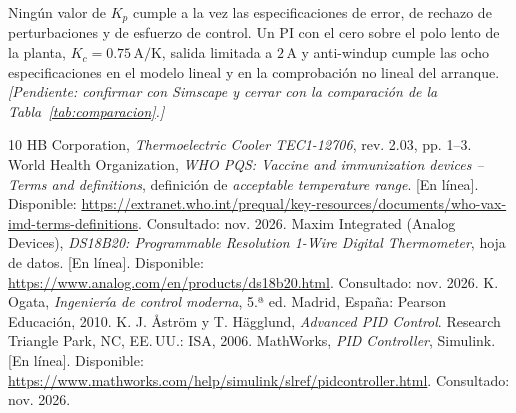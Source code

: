 \documentclass[journal,twocolumn]{IEEEtran}
\newcommand{\pendiente}[1]{\textit{[Pendiente: #1]}}
\begin{document}
Ningún valor de $K_p$ cumple a la vez las especificaciones de error, de rechazo de perturbaciones y de esfuerzo de control. Un PI con el cero sobre el polo lento de la planta, $K_c=0.75\,\mathrm{A/K}$, salida limitada a $2\,\mathrm A$ y anti-windup cumple las ocho especificaciones en el modelo lineal y en la comprobación no lineal del arranque. \pendiente{confirmar con Simscape y cerrar con la comparación de la Tabla~\ref{tab:comparacion}.}


\balance
\begin{thebibliography}{10}
 HB Corporation, \emph{Thermoelectric Cooler TEC1-12706}, rev. 2.03, pp. 1--3.
 World Health Organization, \emph{WHO PQS: Vaccine and immunization devices -- Terms and definitions}, definición de \emph{acceptable temperature range}. [En línea]. Disponible: \url{https://extranet.who.int/prequal/key-resources/documents/who-vax-imd-terms-definitions}. Consultado: nov. 2026.
 Maxim Integrated (Analog Devices), \emph{DS18B20: Programmable Resolution 1-Wire Digital Thermometer}, hoja de datos. [En línea]. Disponible: \url{https://www.analog.com/en/products/ds18b20.html}. Consultado: nov. 2026.
 K. Ogata, \emph{Ingeniería de control moderna}, 5.ª ed. Madrid, España: Pearson Educación, 2010.
 K. J. Åström y T. Hägglund, \emph{Advanced PID Control}. Research Triangle Park, NC, EE.\,UU.: ISA, 2006.
 MathWorks, \emph{PID Controller}, Simulink. [En línea]. Disponible: \url{https://www.mathworks.com/help/simulink/slref/pidcontroller.html}. Consultado: nov. 2026.

\end{thebibliography}
\end{document}
